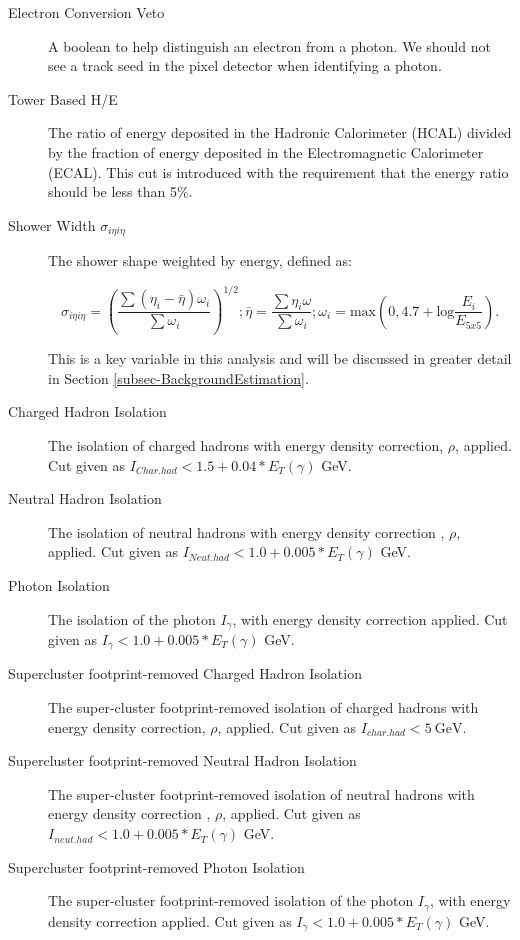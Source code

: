 \begin{description}

\item[Electron Conversion Veto] A boolean to help distinguish an electron from a photon. We should not see a track seed in the pixel detector when identifying a photon. 

\item[Tower Based H/E] The ratio of energy deposited in the Hadronic Calorimeter (HCAL) divided by the fraction of energy deposited in the Electromagnetic Calorimeter (ECAL). This cut is introduced with the requirement that the energy ratio should be less than 5\%.

\item[Shower Width $\sigma_{i\eta i\eta}$] The shower shape weighted by energy, defined as: 

\begin{equation}
\sigma_{i\eta i\eta} = \left(\frac{\sum(\eta_i - \bar{\eta})\omega_i}{\sum\omega_i}\right)^{1/2};  \bar{\eta} = \frac{\sum\eta_i\omega}{\sum\omega_i};  \omega_i = \text{max}\left(0, 4.7 +
\text{log}\frac{E_i}{E_{5x5}}\right).
\end{equation}

This is a key variable in this analysis and will be discussed in greater detail in Section \ref{subsec-BackgroundEstimation}.

\item[Charged Hadron Isolation] The isolation of charged hadrons with energy density correction, $\rho$, applied. Cut given as $I_{Char.had} < 1.5 + 0.04*E_T(\gamma)$ GeV. 

\item[Neutral Hadron Isolation] The isolation of neutral hadrons with energy density correction , $\rho$, applied. Cut given as $I_{Neut.had} < 1.0 + 0.005*E_T(\gamma)$ GeV. 

\item[Photon Isolation] The isolation of the photon $I_{\gamma}$, with energy density correction applied. Cut given as $I_{\gamma} < 1.0 + 0.005*E_T(\gamma)$ GeV.


\item[Supercluster footprint-removed Charged Hadron Isolation] The super-cluster footprint-removed isolation of charged hadrons with energy density correction, $\rho$, applied.
Cut given as $I_{char.had} < 5 \ \text{GeV} $. 

\item[Supercluster footprint-removed Neutral Hadron Isolation] The super-cluster footprint-removed isolation of neutral hadrons with energy density correction , $\rho$, applied.
Cut given as $I_{neut.had} < 1.0 + 0.005*E_T(\gamma)$ GeV. 

\item[Supercluster footprint-removed Photon Isolation] The super-cluster footprint-removed isolation of the photon $I_{\gamma}$, with energy density correction applied. Cut given
as $I_{\gamma} < 1.0 + 0.005*E_T(\gamma)$ GeV. 

\end{description}

